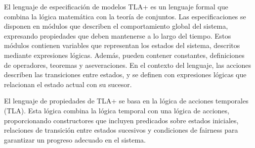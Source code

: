\documentclass[runningheads]{llncs}
\begin{document}
El lenguaje de especificación de modelos TLA+ es un lenguaje formal que combina la lógica matemática con la teoría de conjuntos. Las especificaciones se disponen en módulos que describen el comportamiento global del sistema, expresando propiedades que deben mantenerse a lo largo del tiempo. Estos módulos contienen variables que representan los estados del sistema, descritos mediante expresiones lógicas. Además, pueden contener constantes, definiciones de operadores, teoremas y aseveraciones. En el contexto del lenguaje, las acciones describen las transiciones entre estados, y se definen con expresiones lógicas que relacionan el estado actual con su sucesor.

El lenguaje de propiedades de TLA+ se basa en la lógica de acciones temporales (TLA). Esta lógica combina la lógica temporal con una lógica de acciones, proporcionando constructores que incluyen predicados sobre estados iniciales, relaciones de transición entre estados sucesivos y condiciones de fairness para garantizar un progreso adecuado en el sistema.
\end{document}
